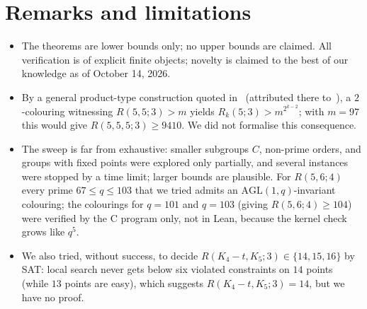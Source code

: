\documentclass[11pt]{article}
\theoremstyle{definition}
\theoremstyle{remark}
\newcommand{\AGL}{\mathrm{AGL}}
\begin{document}
\section{Remarks and limitations}
\begin{itemize}
\item The theorems are lower bounds only; no upper bounds are claimed. All verification is of explicit
 finite objects; novelty is claimed to the best of our knowledge as of October 14, 2026.
\item By a general product-type construction quoted in~\cite[7.1(a)]{DS1} (attributed there to~\cite{BrBH}),
 a $2$-colouring witnessing $R(5,5;3)>m$ yields $R_k(5;3)> m^{2^{k-2}}$; with $m=97$ this would give
 $R(5,5,5;3)\ge 9410$. We did not formalise this consequence.
\item The sweep is far from exhaustive: smaller subgroups $C$, non-prime orders, and groups with fixed
 points were explored only partially, and several instances were stopped by a time limit; larger bounds are
 plausible. For $R(5,6;4)$ every prime $67\le q\le 103$ that we tried admits an $\AGL(1,q)$-invariant
 colouring; the colourings for $q=101$ and $q=103$ (giving $R(5,6;4)\ge 104$) were verified by the C
 program only, not in Lean, because the kernel check grows like $q^5$.
\item We also tried, without success, to decide $R(K_4-t,K_5;3)\in\{14,15,16\}$ by SAT: local search never
 gets below six violated constraints on $14$ points (while $13$ points are easy), which suggests
 $R(K_4-t,K_5;3)=14$, but we have no proof.
\end{itemize}
\end{document}
